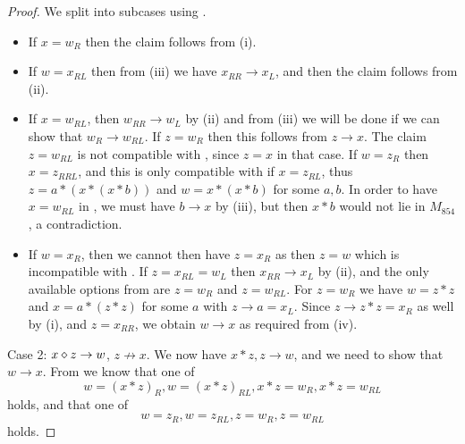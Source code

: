 \begin{proof}
We split into subcases using .
\begin{itemize}
  \item If $x = w_R$ then the claim follows from (i).
  \item If $w = x_{RL}$ then from (iii) we have $x_{RR} \to x_L$, and then the claim follows from (ii).
  \item If $x = w_{RL}$, then $w_{RR} \to w_L$ by (ii) and from (iii) we will be done if we can show that $w_R \to w_{RL}$.  If $z = w_R$ then this follows from $z \to x$.  The claim $z = w_{RL}$ is not compatible with , since $z=x$ in that case. If $w = z_R$ then $x = z_{RRL}$, and this is only compatible with  if $x = z_{RL}$, thus $z = a * (x * (x * b))$ and $w = x  * (x * b)$ for some $a,b$.  In order to have $x = w_{RL}$ in , we must have $b \to x$ by (iii), but then $x*b$ would not lie in $M_{854}$, a contradiction.
  \item If $w = x_R$, then we cannot then have $z = x_R$ as then $z=w$ which is incompatible with .  If $z = x_{RL} = w_L$ then $x_{RR} \to x_L$ by (ii), and the only available options from  are $z = w_R$ and $z = w_{RL}$.  For $z=w_R$ we have $w = z * z$ and $x = a * (z * z)$ for some $a$ with $z \to a = x_L$.  Since $z \to z*z = x_R$ as well by (i), and $z = x_{RR}$, we obtain $w \to x$ as required from (iv).
\end{itemize}

Case 2: $x \diamond z \to w$, $z \not \to x$.  We now have $x * z, z \to w$, and we need to show that $w \to x$.  From  we know that one of
\begin{equation}\label{wz-1}
 w = (x * z)_R, w = (x * z)_{RL}, x * z = w_R, x * z = w_{RL}
\end{equation}
holds, and that one of
\begin{equation}\label{wz}
  w =  z_R, w = z_{RL}, z = w_R, z = w_{RL}
\end{equation}
holds.


\end{proof}
